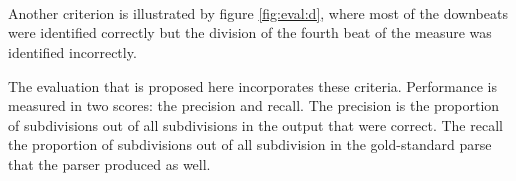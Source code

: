 \begin{figure}
\centering
{}
\\
\\
\\
\end{figure}

Another criterion is illustrated by figure \ref{fig:eval:d}, where most of the downbeats were identified correctly but the division of the fourth beat of the measure was identified incorrectly. 

The evaluation that is proposed here incorporates these criteria. Performance is measured in two scores: the precision and recall. The precision is the proportion of subdivisions out of all subdivisions in the output that were correct. The recall the proportion of subdivisions out of all subdivision in the gold-standard parse that the parser produced as well.

